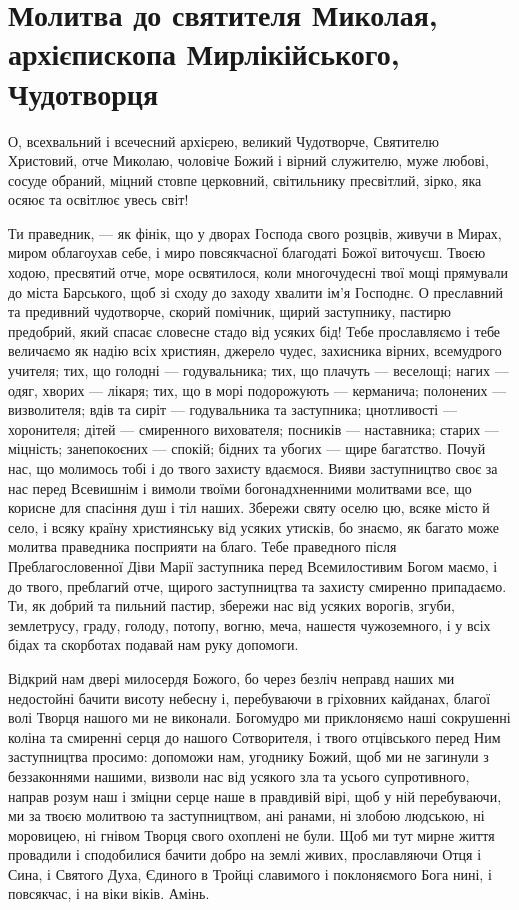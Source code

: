 \documentclass[chapters.tex]{subfiles}
\begin{document}
\section{Молитва до святителя Миколая, архієпископа Мирлікійського, Чудотворця}
О, всехвальний і всечесний архієрею, великий Чудотворче, Святителю Христовий, отче Миколаю, чоловіче Божий і вірний служителю, муже любові, сосуде обраний, міцний стовпе церковний, світильнику пресвітлий, зірко, яка осяює та освітлює увесь світ!

Ти праведник, — як фінік, що у дворах Господа свого розцвів, живучи в Мирах, миром облагоухав себе, і миро повсякчасної благодаті Божої виточуєш. Твоєю ходою, пресвятий отче, море освятилося, коли многочудесні твої мощі прямували до міста Барського, щоб зі сходу до заходу хвалити ім’я Господнє. О преславний та предивний чудотворче, скорий помічник, щирий заступнику, пастирю предобрий, який спасає словесне стадо від усяких бід! Тебе прославляємо і тебе величаємо як надію всіх християн, джерело чудес, захисника вірних, всемудрого учителя; тих, що голодні — годувальника; тих, що плачуть — веселощі; нагих — одяг, хворих — лікаря; тих, що в морі подорожують — керманича; полонених — визволителя; вдів та сиріт — годувальника та заступника; цнотливості — хоронителя; дітей — смиренного вихователя; посників — наставника; старих — міцність; занепокоєних — спокій; бідних та убогих — щире багатство. Почуй нас, що молимось тобі і до твого захисту вдаємося. Вияви заступництво своє за нас перед Всевишнім і вимоли твоїми богонадхненними молитвами все, що корисне для спасіння душ і тіл наших. Збережи святу оселю цю, всяке місто й село, і всяку країну християнську від усяких утисків, бо знаємо, як багато може молитва праведника посприяти на благо. Тебе праведного після Преблагословенної Діви Марії заступника перед Всемилостивим Богом маємо, і до твого, преблагий отче, щирого заступництва та захисту смиренно припадаємо. Ти, як добрий та пильний пастир, збережи нас від усяких ворогів, згуби, землетрусу, граду, голоду, потопу, вогню, меча, нашестя чужоземного, і у всіх бідах та скорботах подавай нам руку допомоги.

Відкрий нам двері милосердя Божого, бо через безліч неправд наших ми недостойні бачити висоту небесну і, перебуваючи в гріховних кайданах, благої волі Творця нашого ми не виконали. Богомудро ми приклоняємо наші сокрушенні коліна та смиренні серця до нашого Сотворителя, і твого отцівського перед Ним заступництва просимо: допоможи нам, угоднику Божий, щоб ми не загинули з беззаконнями нашими, визволи нас від усякого зла та усього супротивного, направ розум наш і зміцни серце наше в правдивій вірі, щоб у ній перебуваючи, ми за твоєю молитвою та заступництвом, ані ранами, ні злобою людською, ні моровицею, ні гнівом Творця свого охоплені не були. Щоб ми тут мирне життя провадили і сподобилися бачити добро на землі живих, прославляючи Отця і Сина, і Святого Духа, Єдиного в Тройці славимого і поклоняємого Бога нині, і повсякчас, і на віки віків. Амінь.
\end{document}
